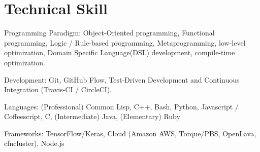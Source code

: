 \documentclass[letterpaper,11pt]{article}
\begin{document}
\begin{CV}

\end{CV}

\renewcommand{\refname}{Selected Publications}

{
\let\uline\relax
\nocite{Asai2021}
\nocite{Asai2021b}
\nocite{Asai2021c}
\nocite{Asai2020}
\nocite{Asai2020c}
\nocite{Asai2019a}
\nocite{Asai2019b}
\nocite{Asai2018}
\nocite{Asai2017e}
\nocite{Asai2017b}
\nocite{Asai2017}
\nocite{Asai2016b}
\nocite{Asai2016}
\nocite{Asai2015}
\nocite{Asai2014}




}

\section{Technical Skill}

\begin{CV}
 \item[Programming Paradigm:] %
 Object-Oriented programming,
 Functional programming,
 Logic / Rule-based programming,
 Metaprogramming, low-level optimization,
 Domain Specific Language(DSL) development, compile-time optimization.
 \item[Development:] Git, GitHub Flow, Test-Driven Development and Continuous Integration (Travis-CI / CircleCI).
 \item[Languages:]
 (Professional) Common Lisp, C++, Bash, Python, Javascript / Coffeescript, C,
 (Intermediate) Java,
 (Elementary)   Ruby
 \item[Frameworks:] TensorFlow/Keras, Cloud (Amazon AWS, Torque/PBS, OpenLava, cfncluster),
 Node.js%
\end{CV}
\end{document}
